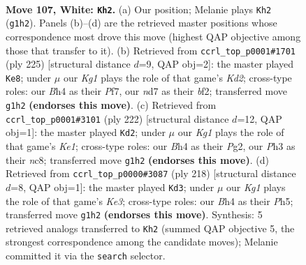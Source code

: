 \documentclass[11pt]{article}
\begin{document}
\clearpage

\begin{figure}[p]\centering
\begin{subfigure}{0.46\textwidth}\centering
\resizebox{\linewidth}{!}{%
\newchessgame
\chessboard[
  setfen={7k/3n4/8/5P2/p6B/P6P/8/6K1 w - - 33 107},
  showmover=false,
  pgfstyle=straightmove, color=movearrow, markmove={g1-h2}
]}
\caption{}
\end{subfigure}\hfill
\begin{subfigure}{0.46\textwidth}\centering
\resizebox{\linewidth}{!}{%
\newchessgame
\chessboard[
  setfen={8/3k1p1p/5P1P/3K4/8/5p2/5B2/8 b - - 55 113},
  showmover=false,
  pgfstyle=straightmove, color=movearrow, markmove={d7-e8}
]}
\caption{}
\end{subfigure}
\\[4pt]
\begin{subfigure}{0.46\textwidth}\centering
\resizebox{\linewidth}{!}{%
\newchessgame
\chessboard[
  setfen={2n5/5k2/8/8/7p/7P/6P1/4K3 w - - 0 112},
  showmover=false,
  pgfstyle=straightmove, color=movearrow, markmove={e1-d2}
]}
\caption{}
\end{subfigure}\hfill
\begin{subfigure}{0.46\textwidth}\centering
\resizebox{\linewidth}{!}{%
\newchessgame
\chessboard[
  setfen={8/7k/3p4/p6P/2P4P/4K3/8/8 w - - 2 110},
  showmover=false,
  pgfstyle=straightmove, color=movearrow, markmove={e3-d3}
]}
\caption{}
\end{subfigure}
\caption{\textbf{Move 107, White: \texttt{Kh2}.} (a) Our position; Melanie plays \texttt{Kh2} (\texttt{g1h2}). Panels (b)--(d) are the retrieved master positions whose correspondence most drove this move (highest QAP objective among those that transfer to it). (b) Retrieved from \texttt{ccrl\_top\_p0001\#1701} (ply 225) [structural distance $d$=9, QAP obj=2]: the master played \texttt{Ke8}; under $\mu$ our \emph{Kg1} plays the role of that game's \emph{Kd2}; cross-type roles: our \emph{B}h4 as their \emph{P}f7, our \emph{n}d7 as their \emph{b}f2; transferred move \texttt{g1h2} \textbf{(endorses this move)}. (c) Retrieved from \texttt{ccrl\_top\_p0001\#3101} (ply 222) [structural distance $d$=12, QAP obj=1]: the master played \texttt{Kd2}; under $\mu$ our \emph{Kg1} plays the role of that game's \emph{Ke1}; cross-type roles: our \emph{B}h4 as their \emph{P}g2, our \emph{P}h3 as their \emph{n}c8; transferred move \texttt{g1h2} \textbf{(endorses this move)}. (d) Retrieved from \texttt{ccrl\_top\_p0000\#3087} (ply 218) [structural distance $d$=8, QAP obj=1]: the master played \texttt{Kd3}; under $\mu$ our \emph{Kg1} plays the role of that game's \emph{Ke3}; cross-type roles: our \emph{B}h4 as their \emph{P}h5; transferred move \texttt{g1h2} \textbf{(endorses this move)}. Synthesis: 5 retrieved analogs transferred to \texttt{Kh2} (summed QAP objective 5, the strongest correspondence among the candidate moves); Melanie committed it via the \texttt{search} selector.}
\label{fig:thought-m212}
\end{figure}
\end{document}

